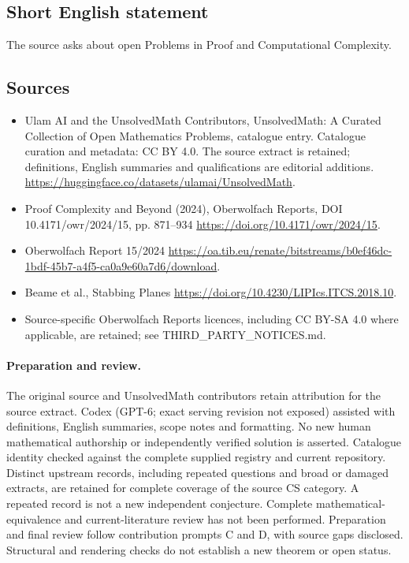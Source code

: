 \documentclass[11pt]{article}
\begin{document}
\subsection{Short English statement}
The source asks about open Problems in Proof and Computational Complexity.
\subsection{Sources}
\begin{itemize}
\item[\hypertarget{source:statement:1}{S1}] Ulam AI and the UnsolvedMath Contributors, UnsolvedMath: A Curated Collection of Open Mathematics Problems, catalogue entry. Catalogue curation and metadata: CC BY 4.0. The source extract is retained; definitions, English summaries and qualifications are editorial additions.
\url{https://huggingface.co/datasets/ulamai/UnsolvedMath}.
\item[\hypertarget{source:statement:2}{S2}] Proof Complexity and Beyond (2024), Oberwolfach Reports, DOI 10.4171/owr/2024/15, pp. 871--934
\url{https://doi.org/10.4171/owr/2024/15}.
\item[\hypertarget{source:statement:3}{S3}] Oberwolfach Report 15/2024
\url{https://oa.tib.eu/renate/bitstreams/b0ef46dc-1bdf-45b7-a4f5-ca0a9e60a7d6/download}.
\item[\hypertarget{source:statement:4}{S4}] Beame et al., Stabbing Planes
\url{https://doi.org/10.4230/LIPIcs.ITCS.2018.10}.
\item Source-specific Oberwolfach Reports licences, including CC BY-SA 4.0 where applicable, are retained; see THIRD\_PARTY\_NOTICES.md.
\end{itemize}
\paragraph{Preparation and review.}
The original source and UnsolvedMath contributors retain attribution for the source extract. Codex (GPT-6; exact serving revision not exposed) assisted with definitions, English summaries, scope notes and formatting. No new human mathematical authorship or independently verified solution is asserted. Catalogue identity checked against the complete supplied registry and current repository. Distinct upstream records, including repeated questions and broad or damaged extracts, are retained for complete coverage of the source CS category. A repeated record is not a new independent conjecture. Complete mathematical-equivalence and current-literature review has not been performed. Preparation and final review follow contribution prompts C and D, with source gaps disclosed. Structural and rendering checks do not establish a new theorem or open status.
\label{end:statement}
\end{document}
